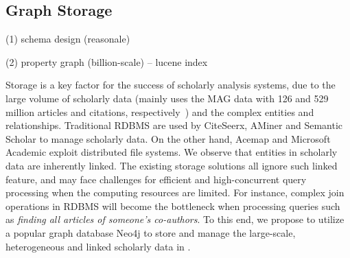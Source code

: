 
\subsection{Graph Storage}


(1) schema design (reasonale)

(2) property graph (billion-scale) -- lucene index

Storage is a key factor for the success of scholarly analysis systems, due to the large volume of scholarly data (\eg \oursystem mainly uses the MAG data with 126 and 529 million articles and citations, respectively~\cite{sinha2015overview}) and the complex entities and relationships.
%
Traditional RDBMS are used by CiteSeerx, AMiner and Semantic Scholar to manage scholarly data. On the other hand, Acemap and Microsoft Academic exploit distributed file systems.
%
We observe that entities in scholarly data are inherently linked. The existing storage solutions all ignore such linked feature, and may face challenges for efficient and high-concurrent query processing when the computing resources are limited. For instance, complex join operations in RDBMS will become the bottleneck when processing queries such as {\em finding all articles of someone's co-authors}.
%
To this end, we propose to utilize a popular graph database Neo4j to store and manage the large-scale, heterogeneous and linked scholarly data in \oursystem.


